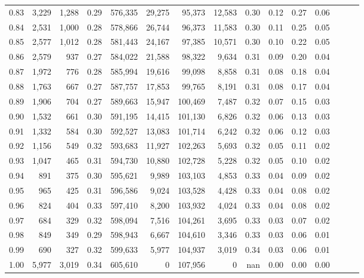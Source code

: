 \begin{tabular}{rrrrrrrrrrrrrrr}
0.83 &   3,229 &  1,288 &  0.29 &  576,335 &   29,275 &   95,373 &   12,583 &  0.30 &  0.12 &  0.27 &      0.06 \\
0.84 &   2,531 &  1,000 &  0.28 &  578,866 &   26,744 &   96,373 &   11,583 &  0.30 &  0.11 &  0.25 &      0.05 \\
0.85 &   2,577 &  1,012 &  0.28 &  581,443 &   24,167 &   97,385 &   10,571 &  0.30 &  0.10 &  0.22 &      0.05 \\
0.86 &   2,579 &    937 &  0.27 &  584,022 &   21,588 &   98,322 &    9,634 &  0.31 &  0.09 &  0.20 &      0.04 \\
0.87 &   1,972 &    776 &  0.28 &  585,994 &   19,616 &   99,098 &    8,858 &  0.31 &  0.08 &  0.18 &      0.04 \\
0.88 &   1,763 &    667 &  0.27 &  587,757 &   17,853 &   99,765 &    8,191 &  0.31 &  0.08 &  0.17 &      0.04 \\
0.89 &   1,906 &    704 &  0.27 &  589,663 &   15,947 &  100,469 &    7,487 &  0.32 &  0.07 &  0.15 &      0.03 \\
0.90 &   1,532 &    661 &  0.30 &  591,195 &   14,415 &  101,130 &    6,826 &  0.32 &  0.06 &  0.13 &      0.03 \\
0.91 &   1,332 &    584 &  0.30 &  592,527 &   13,083 &  101,714 &    6,242 &  0.32 &  0.06 &  0.12 &      0.03 \\
0.92 &   1,156 &    549 &  0.32 &  593,683 &   11,927 &  102,263 &    5,693 &  0.32 &  0.05 &  0.11 &      0.02 \\
0.93 &   1,047 &    465 &  0.31 &  594,730 &   10,880 &  102,728 &    5,228 &  0.32 &  0.05 &  0.10 &      0.02 \\
0.94 &     891 &    375 &  0.30 &  595,621 &    9,989 &  103,103 &    4,853 &  0.33 &  0.04 &  0.09 &      0.02 \\
0.95 &     965 &    425 &  0.31 &  596,586 &    9,024 &  103,528 &    4,428 &  0.33 &  0.04 &  0.08 &      0.02 \\
0.96 &     824 &    404 &  0.33 &  597,410 &    8,200 &  103,932 &    4,024 &  0.33 &  0.04 &  0.08 &      0.02 \\
0.97 &     684 &    329 &  0.32 &  598,094 &    7,516 &  104,261 &    3,695 &  0.33 &  0.03 &  0.07 &      0.02 \\
0.98 &     849 &    349 &  0.29 &  598,943 &    6,667 &  104,610 &    3,346 &  0.33 &  0.03 &  0.06 &      0.01 \\
0.99 &     690 &    327 &  0.32 &  599,633 &    5,977 &  104,937 &    3,019 &  0.34 &  0.03 &  0.06 &      0.01 \\
1.00 &   5,977 &  3,019 &  0.34 &  605,610 &        0 &  107,956 &        0 &   nan &  0.00 &  0.00 &      0.00 \\
\bottomrule
\end{tabular}
